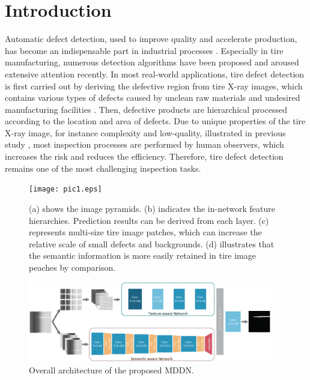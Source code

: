 \documentclass{article}
\begin{document}
\section{Introduction}
\label{sec:intro}
Automatic defect detection, used to improve quality and accelerate production, has become an indispensable part in industrial processes \cite{kumar2008computer,li2016deformable,ghorai2012automatic}. Especially in tire manufacturing, numerous detection algorithms have been proposed \cite{zhang2013texture,zhang2018tire,xiang2014dictionary} and aroused extensive attention recently. In most real-world applications, tire defect detection is first carried out by deriving the defective region from tire X-ray images, which contains various types of defects caused by unclean raw materials and undesired manufacturing facilities \cite{guo2016defect}. Then, defective products are hierarchical processed according to the location and area of defects. Due to unique properties of the tire X-ray image, for instance complexity and low-quality, illustrated in previous study \cite{zhang2013defect,wang2019tire}, most inspection processes are performed by human observers, which increases the risk and reduces the efficiency. Therefore, tire defect detection remains one of the most challenging inspection tasks.
\begin{figure}[t]
  \centering
  \centerline{\texttt{[image: pic1.eps]}}
  \caption{(a) shows the image pyramids. (b) indicates the in-network feature hierarchies. Prediction results can be derived from each layer. (c) represents multi-size tire image patches, which can increase the relative scale of small defects and backgrounds. (d) illustrates that the semantic information is more easily retained in tire image peaches by comparison.}
\end{figure}
\begin{figure}[t]
  \centering
  \centerline{\includegraphics[width=0.95\textwidth]{pic2-4.eps}}
  \caption{Overall architecture of the proposed MDDN. }
\end{figure}
\end{document}
